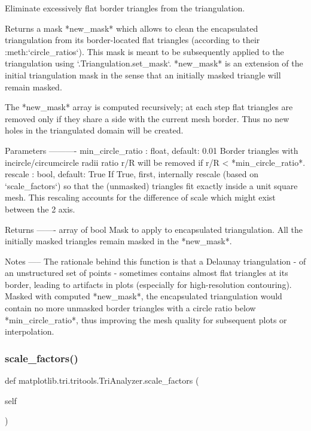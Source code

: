 \begin{DoxyVerb}Eliminate excessively flat border triangles from the triangulation.

Returns a mask *new_mask* which allows to clean the encapsulated
triangulation from its border-located flat triangles
(according to their :meth:`circle_ratios`).
This mask is meant to be subsequently applied to the triangulation
using `.Triangulation.set_mask`.
*new_mask* is an extension of the initial triangulation mask
in the sense that an initially masked triangle will remain masked.

The *new_mask* array is computed recursively; at each step flat
triangles are removed only if they share a side with the current mesh
border. Thus no new holes in the triangulated domain will be created.

Parameters
----------
min_circle_ratio : float, default: 0.01
    Border triangles with incircle/circumcircle radii ratio r/R will
    be removed if r/R < *min_circle_ratio*.
rescale : bool, default: True
    If True, first, internally rescale (based on `scale_factors`) so
    that the (unmasked) triangles fit exactly inside a unit square
    mesh.  This rescaling accounts for the difference of scale which
    might exist between the 2 axis.

Returns
-------
array of bool
    Mask to apply to encapsulated triangulation.
    All the initially masked triangles remain masked in the
    *new_mask*.

Notes
-----
The rationale behind this function is that a Delaunay
triangulation - of an unstructured set of points - sometimes contains
almost flat triangles at its border, leading to artifacts in plots
(especially for high-resolution contouring).
Masked with computed *new_mask*, the encapsulated
triangulation would contain no more unmasked border triangles
with a circle ratio below *min_circle_ratio*, thus improving the
mesh quality for subsequent plots or interpolation.
\end{DoxyVerb}
 \mbox{\label{classmatplotlib_1_1tri_1_1tritools_1_1TriAnalyzer_a60b57a242c096c306f6bce822fdfba1a}} 
\subsubsection{\texorpdfstring{scale\+\_\+factors()}{scale\_factors()}}
{\footnotesize\ttfamily def matplotlib.\+tri.\+tritools.\+Tri\+Analyzer.\+scale\+\_\+factors (\begin{DoxyParamCaption}\item[{}]{self }\end{DoxyParamCaption})}

